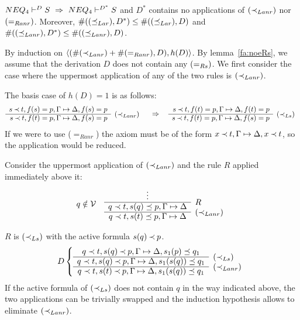 %
\begin{LEMMA}\label{le:noar}\label{le:noRanr} 
${NEQ_4}\vdash^{{D}}S\ \mathrel\Rightarrow\ {NEQ_4}\vdash^{{D^*}}S$
and $D^*$ contains no applications of $(\mathbin{\prec}_{Lanr})$ nor $(=_{Ranr})$.
Moreover, $\#((\preceq_{Lar}),D^*)\leq\#((\preceq_{Lar}),D)$ and
 $\#((\preceq_{Lanr}),D^*)\leq\#((\preceq_{Lanr}),D)$.
\end{LEMMA}
\begin{PROOF}
By induction on $\langle(\#(\mathbin{\prec}_{Lanr})+\#(=_{Ranr}),D),h(D)\rangle$.
By lemma~\ref{fa:noeRs}, we assume that the derivation $D$ does not 
contain any $(=_{Rs})$.
We first consider the case where the uppermost application of any of the
two rules is $(\mathbin{\prec}_{Lanr})$.

The basis
case of $h(D)=1$ is as follows:
\[ \begin{array}{rl}
 s\Incl t, f(s)=p,\GSD, f(s)=p \\ \cline{1-1}
 s\Incl t, f(t)=p,\GSD, f(s)=p & \rabove{\iLanr}
\end{array} 
\conv
\begin{array}{rl}
 s\Incl t, f(t)=p,\GSD, f(t)=p \\ \cline{1-1}
 s\Incl t, f(t)=p,\GSD, f(s)=p & \rabove{\iLs}
\end{array}
\]
If we were to use ($=_{Ranr}$) the axiom must be of the form $x\mathbin{\prec} t,\Gamma\mathrel{\mapsto}\Delta,x\mathbin{\prec} t$, 
so the application would be reduced. 

Consider the uppermost application of $(\mathbin{\prec}_{Lanr})$ and the rule $R$ applied
immediately above it:
\[ q\notin \cal V\ \ \ \begin{array}{cl}
  \vdots & \\ \cline{1-1}
  q\prec t,s(q)\preceq p,\Gamma\Seq\Delta & \rabove{R} \\ \cline{1-1}
  q\prec t,s(t)\preceq p,\Gamma\Seq\Delta & \rabove{\iLanr} 
\end{array} \]
%
\begin{LS}
\item $R$ is $(\mathbin{\prec}_{Ls})$ with the active formula $s(q)\mathbin{\prec} p$. 
  \[D \left\{ \begin{array}{cl}
 q\prec t,s(q)\Incl p,\Gamma \Seq \Delta,s_1(p)\preceq q_1  &
  \\ \cline{1-1}
q\prec t,s(q)\Incl p,\Gamma \Seq \Delta, s_1(s(q))\preceq q_1 &\rabove{\iLs} 
\\ \cline{1-1}
 q\prec t,s(t)\Incl p,\Gamma \Seq\Delta, s_1(s(q))\preceq q_1 &
 \rabove{\iLanr} 
\end{array} \right. \]
If the active formula of $(\mathbin{\prec}_{Ls})$ does not contain $q$ in the way 
indicated above, the two applications can be
trivially swapped and the induction hypothesis allows to eliminate 
$(\mathbin{\prec}_{Lanr})$. 


\end{LS}
\end{PROOF}

